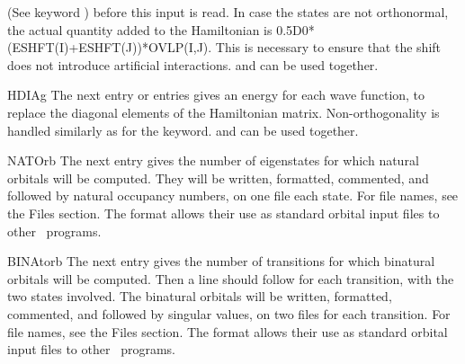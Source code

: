 \begin{keywordlist}
(See keyword ) before this input is read.
In case the states are not orthonormal, the actual quantity added to
the Hamiltonian is 0.5D0*(ESHFT(I)+ESHFT(J))*OVLP(I,J). This is necessary
to ensure that the shift does not introduce artificial interactions.
 and  can be used together.
\item[HDIAg]
The next entry or entries gives an energy for each wave function,
to replace the diagonal elements of the Hamiltonian matrix.
Non-orthogonality is handled similarly as for the  keyword.
 and  can be used together.
\item[NATOrb]
The next entry gives the number of eigenstates for which natural
orbitals will be computed. They will be written, formatted, commented,
and followed by natural occupancy numbers, on one file each state.
For file names, see the Files section.
The format allows their use as standard orbital input files to
other \molcas\ programs.
\item[BINAtorb]
The next entry gives the number of transitions for which binatural
orbitals will be computed. Then a line should follow for each transition,
with the two states involved. The binatural orbitals will be written, formatted, commented,
and followed by singular values, on two files for each transition.
For file names, see the Files section.
The format allows their use as standard orbital input files to
other \molcas\ programs.

\end{keywordlist}
